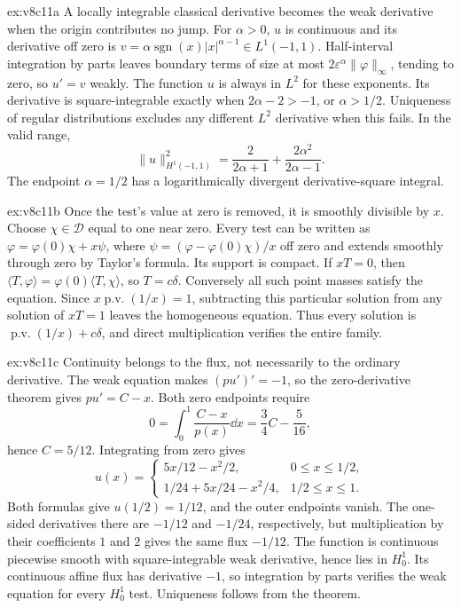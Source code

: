 \begin{solution}{ex:v8c11a}
\idea A locally integrable classical derivative becomes the weak derivative when the origin contributes no jump.
\writeup For $\alpha>0$, $u$ is continuous and its derivative off zero is $v=\alpha\operatorname{sgn}(x)|x|^{\alpha-1}\in L^1(-1,1)$. Half-interval integration by parts leaves boundary terms of size at most $2\varepsilon^\alpha\|\varphi\|_\infty$, tending to zero, so $u'=v$ weakly. The function $u$ is always in $L^2$ for these exponents. Its derivative is square-integrable exactly when $2\alpha-2>-1$, or $\alpha>1/2$. Uniqueness of regular distributions excludes any different $L^2$ derivative when this fails. In the valid range,
\[
\|u\|_{H^1(-1,1)}^2=\frac2{2\alpha+1}+\frac{2\alpha^2}{2\alpha-1}.
\]
The endpoint $\alpha=1/2$ has a logarithmically divergent derivative-square integral.
\end{solution}

\begin{solution}{ex:v8c11b}
\idea Once the test's value at zero is removed, it is smoothly divisible by $x$.
\writeup Choose $\chi\in\mathcal D$ equal to one near zero. Every test can be written as $\varphi=\varphi(0)\chi+x\psi$, where $\psi=(\varphi-\varphi(0)\chi)/x$ off zero and extends smoothly through zero by Taylor's formula. Its support is compact. If $xT=0$, then $\langle T,\varphi\rangle=\varphi(0)\langle T,\chi\rangle$, so $T=c\delta$. Conversely all such point masses satisfy the equation.
Since $x\operatorname{p.v.}(1/x)=1$, subtracting this particular solution from any solution of $xT=1$ leaves the homogeneous equation. Thus every solution is $\operatorname{p.v.}(1/x)+c\delta$, and direct multiplication verifies the entire family.
\end{solution}

\begin{solution}{ex:v8c11c}
\idea Continuity belongs to the flux, not necessarily to the ordinary derivative.
\writeup The weak equation makes $(pu')'=-1$, so the zero-derivative theorem gives $pu'=C-x$. Both zero endpoints require
\[
0=\int_0^1\frac{C-x}{p(x)}\dd x
=\frac34 C-\frac5{16},
\]
hence $C=5/12$. Integrating from zero gives
\[
u(x)=\begin{cases}5x/12-x^2/2,&0\le x\le1/2,\\
1/24+5x/24-x^2/4,&1/2\le x\le1.
\end{cases}
\]
Both formulas give $u(1/2)=1/12$, and the outer endpoints vanish. The one-sided derivatives there are $-1/12$ and $-1/24$, respectively, but multiplication by their coefficients $1$ and $2$ gives the same flux $-1/12$. The function is continuous piecewise smooth with square-integrable weak derivative, hence lies in $H^1_0$. Its continuous affine flux has derivative $-1$, so integration by parts verifies the weak equation for every $H^1_0$ test. Uniqueness follows from the theorem.
\end{solution}

